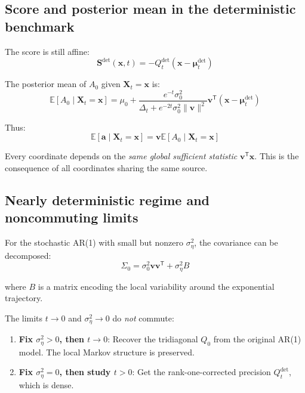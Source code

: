 \documentclass[11pt,a4paper]{article}
\theoremstyle{plain}
\theoremstyle{definition}
\newcommand{\Sig}{\Sigma}
\newcommand{\Prec}{Q}
\newcommand{\delt}{\Delta_t}
\newcommand{\vct}[1]{\mathbf{#1}}
\newcommand{\tr}{\mathsf{T}}
\begin{document}
\subsection{Score and posterior mean in the deterministic benchmark}
\label{sec:det-score}

The score is still affine:
\begin{equation}
\vct{S}^{\text{det}}(\vct{x},t) = -\Prec_t^{\text{det}}(\vct{x} - \boldsymbol{\mu}_t^{\text{det}})
\end{equation}

The posterior mean of $A_0$ given $\vct{X}_t = \vct{x}$ is:
\begin{equation}
\mathbb{E}[A_0 \mid \vct{X}_t = \vct{x}] = \mu_0 + \frac{e^{-t}\sigma_0^2}{\delt + e^{-2t}\sigma_0^2\|\vct{v}\|^2} \vct{v}^\tr(\vct{x} - \boldsymbol{\mu}_t^{\text{det}})
\end{equation}

Thus:
\begin{equation}
\mathbb{E}[\vct{a} \mid \vct{X}_t = \vct{x}] = \vct{v} \mathbb{E}[A_0 \mid \vct{X}_t = \vct{x}]
\end{equation}

Every coordinate depends on the \emph{same global sufficient statistic} $\vct{v}^\tr\vct{x}$. This is the consequence of all coordinates sharing the same source.

\subsection{Nearly deterministic regime and noncommuting limits}
\label{sec:nearly-det}

For the stochastic AR(1) with small but nonzero $\sigma_\eta^2$, the covariance can be decomposed:
\begin{equation}
\Sig_0 = \sigma_0^2 \vct{v}\vct{v}^\tr + \sigma_\eta^2 B
\end{equation}

where $B$ is a matrix encoding the local variability around the exponential trajectory.

The limits $t \to 0$ and $\sigma_\eta^2 \to 0$ do \emph{not} commute:

\begin{enumerate}
\item \textbf{Fix $\sigma_\eta^2 > 0$, then $t \to 0$}: Recover the tridiagonal $\Prec_0$ from the original AR(1) model. The local Markov structure is preserved.

\item \textbf{Fix $\sigma_\eta^2 = 0$, then study $t > 0$}: Get the rank-one-corrected precision $\Prec_t^{\text{det}}$, which is dense.
\end{enumerate}
\end{document}
